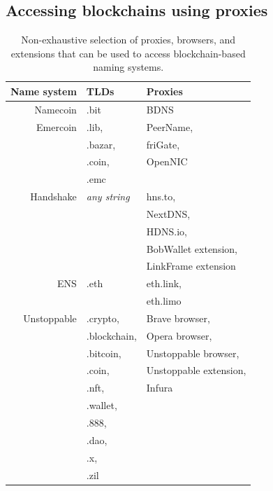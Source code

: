


\subsection{Accessing blockchains using proxies}

\begin{table}
	\begin{tabular}{r l l}
		\toprule
		Name system & TLDs & Proxies \\
		\midrule
		Namecoin & .bit & BDNS \\
		Emercoin & .lib, & PeerName,  \\
		& .bazar, & friGate, \\
		& .coin, & OpenNIC \\
		& .emc & \\
		Handshake & \emph{any string} & hns.to, \\
		& & NextDNS, \\
		& & HDNS.io,\\
		& & BobWallet extension, \\
		& & LinkFrame extension \\
		ENS & .eth & eth.link, \\
		& & eth.limo \\
		Unstoppable & .crypto, & Brave browser, \\
		& .blockchain, & Opera browser, \\
		& .bitcoin, & Unstoppable browser, \\
		& .coin, & Unstoppable extension, \\
		& .nft, & Infura\\
		& .wallet, & \\
		& .888, & \\
		& .dao, & \\
		& .x, & \\
		& .zil & \\
		\bottomrule
	\end{tabular}
	\caption{Non-exhaustive selection of proxies, browsers, 
		and extensions 
		that can be used to access blockchain-based naming 
		systems. }
	\label{tab:proxies_and_tlds}
\end{table}

